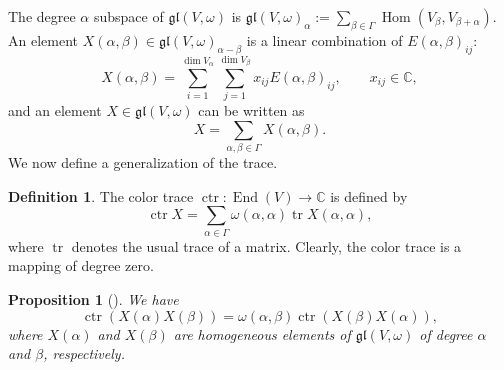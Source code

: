 \documentclass[10pt,a4paper]{amsart}
\numberwithin{equation}{section}
\newtheorem{Proposition}[Theorem]{Proposition}
\theoremstyle{definition}
\newtheorem{Definition}[Theorem]{Definition}
\def\gl{\mathfrak{gl}}
\begin{document}
The degree $\alpha$ subspace of $\gl(V,\omega)$ is
$ \gl(V,\omega)_{\alpha} := \sum_{\beta \in \Gamma} \operatorname{Hom}(V_{\beta}, V_{\beta+\alpha}).$
An element $ X(\alpha,\beta) \in \gl(V,\omega)_{\alpha-\beta}$ is a linear combination of $E(\alpha,\beta)_{ij}$:
\begin{equation*}
	X(\alpha,\beta) = \sum_{i=1}^{\dim V_\alpha} \sum_{j=1}^{\dim V_\beta} x_{ij} E(\alpha,\beta)_{ij}, \qquad x_{ij} \in \mathbb{C},
\end{equation*}
and an element $ X \in \gl(V,\omega)$ can be written as
\begin{equation*}
	X = \sum_{\alpha,\beta\in \Gamma} X(\alpha,\beta).
\end{equation*}
We now define a generalization of the trace.

\begin{Definition}
	The color trace $\operatorname{ctr}\colon \operatorname{End}(V) \to \mathbb{C}$ is defined by
	\begin{equation*}
		\operatorname{ctr} X = \sum_{\alpha \in \Gamma} \omega(\alpha,\alpha) \operatorname{tr} X(\alpha,\alpha),
	\end{equation*}
	where $\operatorname{tr}$ denotes the usual trace of a matrix. Clearly, the color trace is a mapping of degree zero.
\end{Definition}
%
\begin{Proposition}[\cite{scheuTen,zhang2025}] We have
	\begin{equation}
		\operatorname{ctr}(X(\alpha) X(\beta)) = \omega(\alpha,\beta) \operatorname{ctr}(X(\beta) X(\alpha)),
		\label{ctrperm}
	\end{equation}
	where $ X(\alpha)$ and $ X(\beta) $ are homogeneous elements of $\gl(V,\omega)$ of degree $\alpha$ and $\beta$, respectively.
\end{Proposition}
\end{document}
